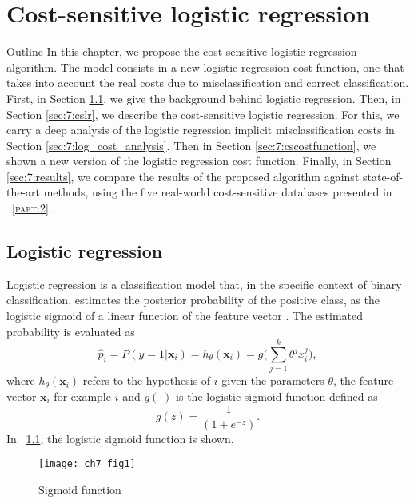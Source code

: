 \chapter{Cost-sensitive logistic regression}\label{ch:7}

\begin{remark}{Outline}
In this chapter, we propose the cost-sensitive logistic regression algorithm. The model consists in 
a new logistic regression cost function, one that takes into account the real costs due to 
misclassification and correct classification. First, in Section \ref{sec:7:logistic}, we give the 
background behind logistic regression. Then, in Section \ref{sec:7:cslr}, we describe the 
cost-sensitive logistic regression. For this, we carry a deep analysis of the 
logistic regression implicit misclassification costs in Section \ref{sec:7:log_cost_analysis}. Then 
in Section \ref{sec:7:cscostfunction}, we shown a new version of the logistic regression cost 
function. 
Finally, in Section \ref{sec:7:results}, we compare the results of the proposed 
algorithm against state-of-the-art methods, using the five real-world cost-sensitive databases 
presented in \partname{~\textsc{\ref{part:2}}}.
\end{remark}


\section{Logistic regression}
\label{sec:7:logistic}

Logistic regression is a classification model that, in the specific context of binary 
classification, estimates the posterior probability of the positive class, as the logistic sigmoid 
of a linear function of the feature vector \citep{Bishop2006}. The estimated probability  is 
evaluated as 
\begin{equation}
  \hat p_i = P(y=1 \vert \mathbf{x}_i) = h_{\theta}(\mathbf{x}_i) = 
  g\bigg(\sum_{j=1}^{k}{\theta^jx_i^j}\bigg),
\end{equation}
where $h_\theta(\mathbf{x}_i)$ refers to the hypothesis of $i$ given the parameters $\theta$, the 
feature vector $\mathbf{x}_i$ for example $i$ and  $g(\cdot)$ is the logistic sigmoid function 
defined as
\begin{equation}
  g(z)=\frac{1}{(1+e^{-z})} .
\end{equation}
In \figurename{~\ref{fig:ch7:1}}, the logistic sigmoid function is shown.
\begin{figure}[htbp]
  \centering
  \texttt{[image: ch7\_fig1]}
  \caption{Sigmoid function}
  \label{fig:ch7:1}
\end{figure}

